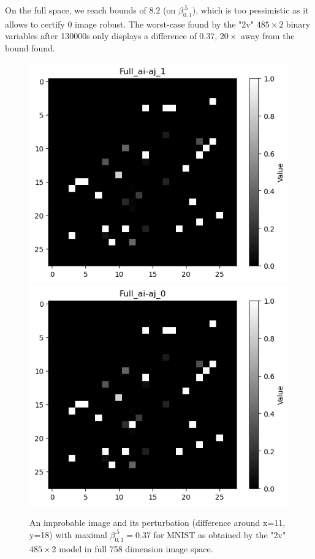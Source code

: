 \documentclass[letterpaper]{article} %
\begin{document}
On the full space, we reach bounds of $8.2$ (on $\beta^{.5}_{0,1}$), which is too pessimistic as it allows to certify 0 image robust. The worst-case found by the "2v" $485 \times 2$ binary variables after 130000s only displays a difference of 
$0.37$, $20 \times$ away from the bound found.

\begin{figure}[t!]
	\centering
\includegraphics[scale=0.5]{image.png} \hspace{0.8cm}
\includegraphics[scale=0.5]{perturb.png}
\caption{An improbable image and its perturbation (difference around x=11, y=18) 
with maximal $\beta^{.5}_{0,1}=0.37$ for MNIST as obtained by the "2v" $485 \times 2$ model in full 758 dimension image space.}
\end{figure}	
\end{document}
